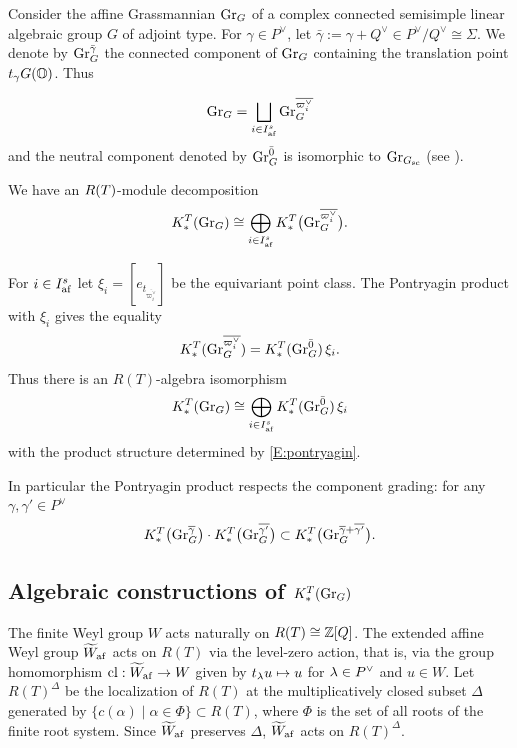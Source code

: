 \documentclass[a4paper]{amsart}
\theoremstyle{remark}
\numberwithin{equation}{section}
\begin{document}
Consider the affine Grassmannian $\mathrm{Gr}_{G}$ of a complex connected semisimple linear algebraic group $G$ of adjoint type. For \(\gamma\in P^\lor\), let
$
\bar\gamma:=\gamma+Q^\lor\in P^\lor/Q^\lor\cong \Sigma.
$
We denote by
$
\mathrm{Gr}_{G}^{\bar\gamma}
$
the connected component of \(\mathrm{Gr}_{G}\) containing the translation
point \(t_\gamma G(\mathbb{O})\).  Thus
{
\[
\mathrm{Gr}_{G}
= \bigsqcup_{i\in I_{\mathrm{af}}^s} \mathrm{Gr}_{G}^{\overline{\varpi_i^\vee}}
\]
and the neutral component denoted by
$\mathrm{Gr}_{G}^{\bar 0}$
is isomorphic to $\mathrm{Gr}_{G_{\mathrm{sc}}}$ (see \cite[Theorem 1.3.11(3)]{Zhu}). 



We have an
\(R(T)\)-module decomposition
\[
K_*^{T}(\mathrm{Gr}_{G})
\cong
\bigoplus_{i\in I_{\mathrm{af}}^s}
K_*^{T}
\bigl(\mathrm{Gr}_{G}^{\overline{\varpi_i^\vee}}\bigr).
\]


For $i\in I_{\mathrm{af}}^s$ let $\xi_i = [e_{t_{\overline{\varpi_i^\vee}}}]$ be the equivariant point class.
The Pontryagin product with $\xi_i$ gives the equality
\[
K_*^{T}(\mathrm{Gr}_{G}^{\overline{\varpi_i^\vee}})
=
K_*^{T}(\mathrm{Gr}_{G}^{\bar 0})\, \xi_i.
\]
Thus there is an $R(T)$-algebra isomorphism
\[
K_*^{T}(\mathrm{Gr}_{G})
\cong
\bigoplus_{i\in I_{\mathrm{af}}^s}
K_*^{T}(\mathrm{Gr}_{G}^{\bar 0})
\,\xi_i
\]
with the product structure determined by \eqref{E:pontryagin}.}
In particular the Pontryagin product respects the component grading: for any $\gamma,\gamma'\in P^\vee$
\[
K_*^{T}
\bigl(\mathrm{Gr}_{G}^{\overline{\gamma}}\bigr)
\cdot K_*^{T}
\bigl(\mathrm{Gr}_{G}^{\overline{\gamma'}}\bigr)
\subset
K_*^{T}
\bigl(\mathrm{Gr}_{G}^{\overline{\gamma}+\overline{\gamma'}}\bigr).
\]


\subsection{Algebraic constructions of $K^T_*(\mathrm{Gr}_G)$}
The finite Weyl group $W$ acts naturally on { $R(T)\cong \mathbb{Z}[Q]$}.
The extended affine Weyl group $\widetilde{W}_{\mathrm{af}}$ acts on $R(T)$ via the level-zero action, that is, via the group homomorphism 
$\mathrm{cl}:\widetilde{W}_{\mathrm{af}}\to W$ given by $t_\lambda u\mapsto u$ for $\lambda\in P^\lor$ and $u\in W$. Let $R(T)^\Delta$ be the localization of $R(T)$ at the multiplicatively closed subset $\Delta$ generated by $\{c(\alpha) \mid \alpha\in \Phi\}\subset R(T)$, where $\Phi$ is the set of all roots of the finite root system. Since $\widetilde{W}_{\mathrm{af}}$ preserves $\Delta$, $\widetilde{W}_{\mathrm{af}}$ acts on $R(T)^\Delta$.
\end{document}
